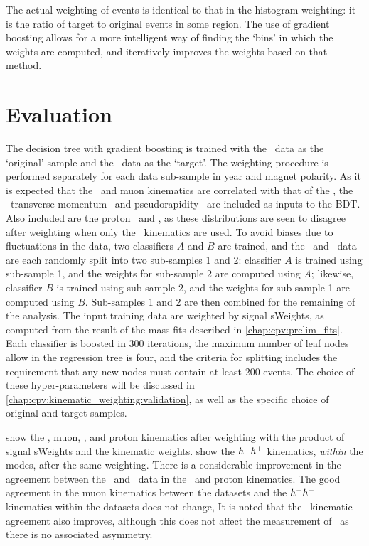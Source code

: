 The actual weighting of events is identical to that in the histogram weighting: 
it is the ratio of target to original events in some region.
The use of gradient boosting allows for a more intelligent way of finding the 
`bins' in which the weights are computed, and iteratively improves the weights 
based on that method.

\section{Evaluation}
\label{chap:cpv:kinematic_weighting:evaluation}

The decision tree with gradient boosting is trained with the \ppipi\ data as 
the `original' sample and the \pKK\ data as the `target'.
The weighting procedure is performed separately for each data sub-sample in 
year and magnet polarity.
As it is expected that the \PLambdab\ and muon kinematics are correlated with 
that of the \PLambdac, the \PLambdac\ transverse momentum \pT\ and 
pseudorapidity \Eta\ are included as inputs to the \ac{BDT}.
Also included are the proton \pT\ and \Eta, as these distributions are seen to 
disagree after weighting when only the \PLambdac\ kinematics are used.
To avoid biases due to fluctuations in the data, two classifiers $A$ and $B$ 
are trained, and the \pKK\ and \ppipi\ data are each randomly split into two 
sub-samples 1 and 2: classifier $A$ is trained using sub-sample 1, and the 
weights for sub-sample 2 are computed using $A$; likewise, classifier $B$ is 
trained using sub-sample 2, and the weights for sub-sample 1 are computed using 
$B$.
Sub-samples 1 and 2 are then combined for the remaining of the analysis.
The input training data are weighted by signal sWeights, as computed from the 
result of the mass fits described in \cref{chap:cpv:prelim_fits}.
Each classifier is boosted in 300 iterations, the maximum number of leaf nodes 
allow in the regression tree is four, and the criteria for splitting includes 
the requirement that any new nodes must contain at least 200 events.
The choice of these hyper-parameters will be discussed in 
\cref{chap:cpv:kinematic_weighting:validation}, as well as the specific choice 
of original and target samples.

show the \PLambdab, muon, \PLambdac, and proton kinematics after weighting with 
the product of signal sWeights and the kinematic weights.
show the $h^{-}h^{+}$ kinematics, \emph{within} the modes, after the same 
weighting.
There is a considerable improvement in the agreement between the \pKK\ and 
\ppipi\ data in the \PLambdab\ and proton kinematics.
The good agreement in the muon kinematics between the datasets and the 
$h^{-}h^{-}$ kinematics within the datasets does not change,
It is noted that the \PLambdac\ kinematic agreement also improves, although 
this does not affect the measurement of \dACP\ as there is no associated 
asymmetry.

